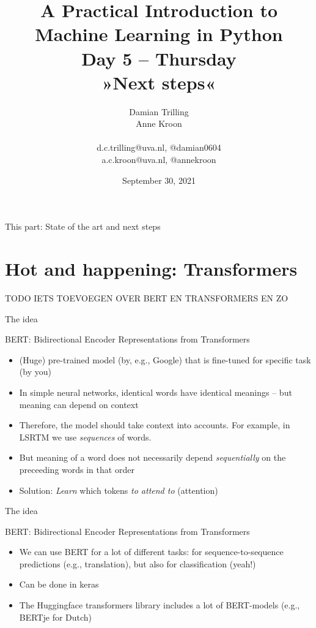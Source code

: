 \documentclass[compress]{beamer}
\title[ML in PYthon]{\textbf{A Practical Introduction to Machine Learning in Python} \\Day 5 -- Thursday \\ »Next steps«}
\author[Damian Trilling, Anne Kroon]{Damian Trilling \\ Anne Kroon \\ ~ \\ \footnotesize{d.c.trilling@uva.nl, @damian0604 \\a.c.kroon@uva.nl, @annekroon} \\}
\date{September 30, 2021}
\institute[Gesis]{Gesis}
\begin{document}
\begin{frame}{}
	\titlepage
\end{frame}

\begin{frame}{This part: State of the art and next steps}
	\tableofcontents
\end{frame}




\section{Hot and happening: Transformers}

\begin{frame}[standout]
TODO IETS TOEVOEGEN OVER BERT EN TRANSFORMERS EN ZO
\end{frame}

\begin{frame}{The idea}
\begin{block}{BERT: Bidirectional Encoder Representations from Transformers 	\parencite{BERT}}
	\begin{itemize}[<+->]
		\item (Huge) pre-trained model (by, e.g., Google) that is fine-tuned for specific task (by you)
		\item In simple neural networks, identical words have identical meanings -- but meaning can depend on context
		\item Therefore, the model should take context into accounts. For example, in LSRTM we use \emph{sequences} of words.
		\item But meaning of a word does not necessarily depend \emph{sequentially} on the preceeding words in that order
		\item Solution: \textit{Learn} which tokens \emph{to attend to} (attention)
	\end{itemize}
\end{block}
\end{frame}

\begin{frame}{The idea}
	\begin{block}{BERT: Bidirectional Encoder Representations from Transformers \parencite{BERT}}
		\begin{itemize}[<+->]
			\item We can use BERT for a lot of different tasks: for sequence-to-sequence predictions (e.g., translation), but also for classification (yeah!)
			\item Can be done in keras
			\item The Huggingface transformers library includes a lot of BERT-models (e.g., BERTje for Dutch)
		\end{itemize}
	\end{block}
\end{frame}
\end{document}
